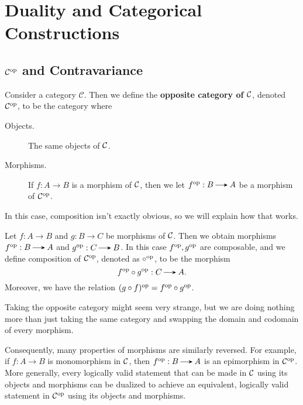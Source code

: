 \chapter{Duality and Categorical Constructions} 
    \section{$\mathcal{C}^{\mathrm{op}}$ and Contravariance}
    
    \begin{definition}
        Consider a category $\mathcal{C}$. Then we define the
        \textbf{opposite category of $\mathcal{C}$}, denoted $\mathcal{C}^{\mathrm{op}}$, 
        to be the category where 
        \begin{description}
            \item[Objects.] The same objects of $\mathcal{C}$.
            \item[Morphisms.] If $f: A \to B$ is a
            morphism of $\mathcal{C}$, then we let 
            $f\op : B \to A$ be a morphism of $\mathcal{C}^{\mathrm{op}}$.
        \end{description}
        In this case, composition isn't exactly obvious, so we will explain how that 
        works. 

        Let $f: A \to B$ and $g: B \to C$ be morphisms of $\mathcal{C}$. Then we obtain 
        morphisms $f\op: B \to A$ and $g\op: C \to B$. In this case $f^{\mathrm{op}}, g^{\mathrm{op}}$ are composable, 
        and we define composition of $\mathcal{C}^{\mathrm{op}}$, 
        denoted as $\circ^{\mathrm{op}}$, 
        to be the morphism 
        \[
            f\op \circ g\op: C \to A.
        \]
        Moreover, we have the relation $(g \circ f)^{\mathrm{op}} = f^{\mathrm{op}} \circ g^{\mathrm{op}}$.
    \end{definition}

    Taking the opposite category might seem very strange, 
    but we are doing nothing more than just taking the same category 
    and swapping the domain and codomain of every
    morphism. 
    
    Consequently, many properties of morphisms are similarly reversed.
    For example, if $f: A \to B$ is
    monomorphism in $\mathcal{C}$, then $f\op: B \to A$ is an epimorphism in 
    $\mathcal{C}^{\mathrm{op}}$. 
    More generally, every logically valid statement that can be made in
    $\mathcal{C}$ using its objects and morphisms can be dualized to achieve an
    equivalent, logically valid statement in $\mathcal{C}^{\mathrm{op}}$ using its
    objects and morphisms. 

